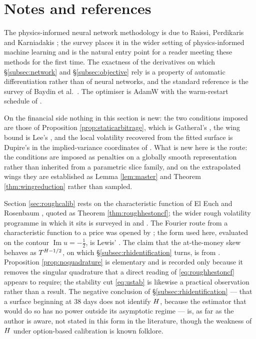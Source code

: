 \section*{Notes and references}

\noindent
The physics-informed neural network methodology is due to Raissi, Perdikaris and Karniadakis
\cite{raissi2019}; the survey \cite{karniadakis2021} places it in the wider setting of
physics-informed machine learning and is the natural entry point for a reader meeting these methods
for the first time. The exactness of the derivatives on which \S\ref{subsec:network} and
\S\ref{subsec:objective} rely is a property of automatic differentiation rather than of neural
networks, and the standard reference is the survey of Baydin et al.\ \cite{baydin2018}. The optimiser
is AdamW \cite{loshchilov2019} with the warm-restart schedule of \cite{loshchilov2017}.

On the financial side nothing in this section is new: the two conditions imposed are those of
Proposition \ref{prop:staticarbitrage}, which is Gatheral's \cite{gatheral2006}, the wing bound is
Lee's \cite{lee2004}, and the local volatility recovered from the fitted surface is Dupire's
\cite{dupire1994} in the implied-variance coordinates of \cite{gatheral2014}. What is new here is the
route: the conditions are imposed as penalties on a globally smooth representation rather than
inherited from a parametric slice family, and on the extrapolated wings they are established as
Lemma \ref{lem:master} and Theorem \ref{thm:wingreduction} rather than sampled.

\medskip

\noindent
Section \ref{sec:roughcalib} rests on the characteristic function of El Euch and Rosenbaum
\cite{eleucrosenbaum2019}, quoted as Theorem \ref{thm:roughhestoncf}; the wider rough volatility
programme in which it sits is surveyed in \cite{bayerfrizfukasawa2023} and \cite{dinunno2023}. The
Fourier route from a characteristic function to a price was opened by \cite{carrmadan1999}; the
form used here, evaluated on the contour $\operatorname{Im}u=-\tfrac12$, is Lewis'
\cite{lewis2001}. The claim that
the at-the-money skew behaves as $T^{H-1/2}$, on which \S\ref{subsec:rhidentification} turns, is
from \cite{gatheraljaissonrosenbaum2018}. Proposition \ref{prop:noquadrature} is elementary and is
recorded only because it removes the singular quadrature that a direct reading of
\eqref{eq:roughhestoncf} appears to require; the stability cut \eqref{eq:ustab} is likewise a
practical observation rather than a result. The negative conclusion of
\S\ref{subsec:rhidentification} --- that a surface beginning at $38$ days does not identify $H$,
because the estimator that would do so has no power outside its asymptotic regime --- is, as far as
the author is aware, not stated in this form in the literature, though the weakness of $H$ under
option-based calibration is known folklore.

